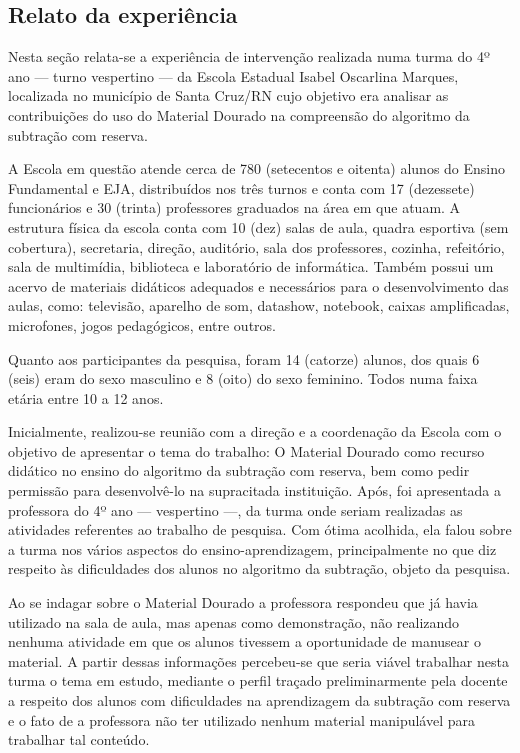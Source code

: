 \begin{refsection}
    \section{Relato da experiência}

    Nesta seção relata-se a experiência de intervenção realizada numa turma do 4º ano --- turno vespertino --- da Escola Estadual Isabel Oscarlina Marques, localizada no município de Santa Cruz/RN cujo objetivo era analisar as contribuições do uso do Material Dourado na compreensão do algoritmo da subtração com reserva.

    A Escola em questão atende cerca de 780 (setecentos e oitenta) alunos do Ensino Fundamental e EJA, distribuídos nos três turnos e conta com 17 (dezessete) funcionários e 30 (trinta) professores graduados na área em que atuam. A estrutura física da escola conta com 10 (dez) salas de aula, quadra esportiva (sem cobertura), secretaria, direção, auditório, sala dos professores, cozinha, refeitório, sala de multimídia, biblioteca e laboratório de informática. Também possui um acervo de materiais didáticos adequados e necessários para o desenvolvimento das aulas, como: televisão, aparelho de som, datashow, notebook, caixas amplificadas, microfones, jogos pedagógicos, entre outros.  

    Quanto aos participantes da pesquisa, foram 14 (catorze) alunos, dos quais 6 (seis) eram do sexo masculino e 8 (oito) do sexo feminino. Todos numa faixa etária entre 10 a 12 anos. 

    Inicialmente, realizou-se reunião com a direção e a coordenação da Escola com o objetivo de apresentar o tema do trabalho: O Material Dourado como recurso didático no ensino do algoritmo da subtração com reserva, bem como pedir permissão para desenvolvê-lo na supracitada instituição. Após, foi apresentada a professora do 4º ano --- vespertino ---, da turma onde seriam realizadas as atividades referentes ao trabalho de pesquisa.  Com ótima acolhida, ela falou sobre a turma nos vários aspectos do ensino-aprendizagem, principalmente no que diz respeito às dificuldades dos alunos no algoritmo da subtração, objeto da pesquisa.  

    Ao se indagar sobre o Material Dourado a professora respondeu que já havia utilizado na sala de aula, mas apenas como demonstração, não realizando nenhuma atividade em que os alunos tivessem a oportunidade de manusear o material. A partir dessas informações percebeu-se que seria viável trabalhar nesta turma o tema em estudo, mediante o perfil traçado preliminarmente pela docente a respeito dos alunos com dificuldades na aprendizagem da subtração com reserva e o fato de a professora não ter utilizado nenhum material manipulável para trabalhar tal conteúdo.  


\end{refsection}
